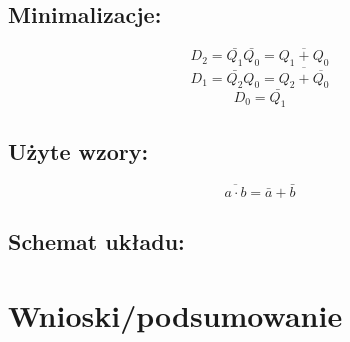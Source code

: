 \documentclass[12pt,a4paper]{article}
\begin{document}
		\subsection{Minimalizacje:}
			
			\begin{displaymath}
			D_2 = \bar{Q_1}\bar{Q_0} = \overline{Q_1 + Q_0}
			\end{displaymath}
			\begin{displaymath}
			D_1 = \bar{Q_2}Q_0 = \overline{Q_2 + \overline{Q_0}}
			\end{displaymath}
			\begin{displaymath}
			D_0 = \bar{Q_1}
			\end{displaymath}
			
		\subsection{Użyte wzory:}
			\begin{equation}
			\overline{a\cdot b}=\bar{a}+\bar{b}
			\end{equation}
			
		\subsection{Schemat układu:}
		
	

	\section{Wnioski/podsumowanie}
	
\end{document}

